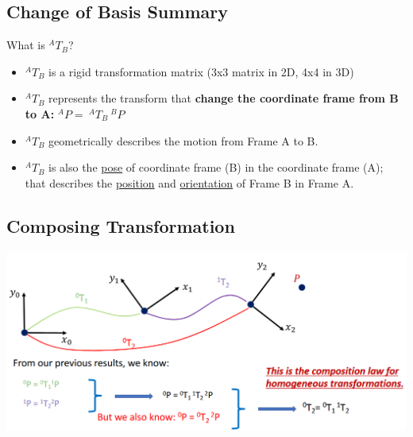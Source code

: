 \documentclass[10pt]{article}
\begin{document}
\subsection*{Change of Basis Summary}
What is $^A T_B$?
\begin{itemize}
	\item $^A T_B$ is a rigid transformation matrix (3x3 matrix in 2D, 4x4 in 3D)
	\item $^A T_B$ represents the transform that \textbf{change the coordinate frame from B to A:} $^A P = \:^A T_B \:^B P$
	\item $^A T_B$ geometrically describes the motion from Frame A to B.
	\item $^A T_B$ is also the \underline{pose} of coordinate frame (B) in the coordinate frame (A); that describes the \underline{position} and \underline{orientation} of Frame B in Frame A.
\end{itemize}

\subsection*{Composing Transformation}
\begin{center} 
	\includegraphics*[width=\textwidth]{L1_13.png} 
\end{center}
\end{document}
